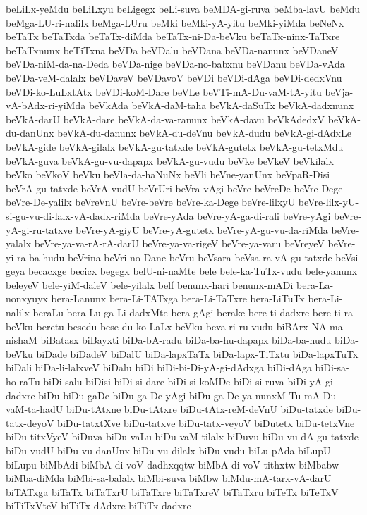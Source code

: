 {beLiLx-yeMdu
beLiLxyu
beLigegx
beLi-suva
beMDA-gi-ruva
beMba-lavU
beMdu
beMga-LU-ri-nalilx
beMga-LUru
beMki
beMki-yA-yitu
beMki-yiMda
beNeNx
beTaTx
beTaTxda
beTaTx-diMda
beTaTx-ni-Da-beVku
beTaTx-ninx-TaTxre
beTaTxnunx
beTiTxna
beVDa
beVDalu
beVDana
beVDa-nanunx
beVDaneV
beVDa-niM-da-na-Deda
beVDa-nige
beVDa-no-babxnu
beVDanu
beVDa-vAda
beVDa-veM-dalalx
beVDaveV
beVDavoV
beVDi
beVDi-dAga
beVDi-dedxVnu
beVDi-ko-LuLxtAtx
beVDi-koM-Dare
beVLe
beVTi-mA-Du-vaM-tA-yitu
beVja-vA-bAdx-ri-yiMda
beVkAda
beVkA-daM-taha
beVkA-daSuTx
beVkA-dadxnunx
beVkA-darU
beVkA-dare
beVkA-da-va-ranunx
beVkA-davu
beVkAdedxV
beVkA-du-danUnx
beVkA-du-danunx
beVkA-du-deVnu
beVkA-dudu
beVkA-gi-dAdxLe
beVkA-gide
beVkA-gilalx
beVkA-gu-tatxde
beVkA-gutetx
beVkA-gu-tetxMdu
beVkA-guva
beVkA-gu-vu-dapapx
beVkA-gu-vudu
beVke
beVkeV
beVkilalx
beVko
beVkoV
beVku
beVla-da-haNuNx
beVli
beVne-yanUnx
beVpaR-Disi
beVrA-gu-tatxde
beVrA-vudU
beVrUri
beVra-vAgi
beVre
beVreDe
beVre-Dege
beVre-De-yalilx
beVreVnU
beVre-beVre
beVre-ka-Dege
beVre-lilxyU
beVre-lilx-yU-si-gu-vu-di-lalx-vA-dadx-riMda
beVre-yAda
beVre-yA-ga-di-rali
beVre-yAgi
beVre-yA-gi-ru-tatxve
beVre-yA-giyU
beVre-yA-gutetx
beVre-yA-gu-vu-da-riMda
beVre-yalalx
beVre-ya-va-rA-rA-darU
beVre-ya-va-rigeV
beVre-ya-varu
beVreyeV
beVre-yi-ra-ba-hudu
beVrina
beVri-no-Dane
beVru
beVsara
beVsa-ra-vA-gu-tatxde
beVsi-geya
becacxge
becicx
begegx
belU-ni-naMte
bele
bele-ka-TuTx-vudu
bele-yanunx
beleyeV
bele-yiM-daleV
bele-yilalx
belf
benunx-hari
benunx-mADi
bera-La-nonxyuyx
bera-Lanunx
bera-Li-TATxga
bera-Li-TaTxre
bera-LiTuTx
bera-Li-nalilx
beraLu
bera-Lu-ga-Li-dadxMte
bera-gAgi
berake
bere-ti-dadxre
bere-ti-ra-beVku
beretu
besedu
bese-du-ko-LaLx-beVku
beva-ri-ru-vudu
biBArx-NA-ma-nishaM
biBatasx
biBayxti
biDa-bA-radu
biDa-ba-hu-dapapx
biDa-ba-hudu
biDa-beVku
biDade
biDadeV
biDalU
biDa-lapxTaTx
biDa-lapx-TiTxtu
biDa-lapxTuTx
biDali
biDa-li-lalxveV
biDalu
biDi
biDi-bi-Di-yA-gi-dAdxga
biDi-dAga
biDi-sa-ho-raTu
biDi-salu
biDisi
biDi-si-dare
biDi-si-koMDe
biDi-si-ruva
biDi-yA-gi-dadxre
biDu
biDu-gaDe
biDu-ga-De-yAgi
biDu-ga-De-ya-nunxM-Tu-mA-Du-vaM-ta-hadU
biDu-tAtxne
biDu-tAtxre
biDu-tAtx-reM-deVnU
biDu-tatxde
biDu-tatx-deyoV
biDu-tatxtXve
biDu-tatxve
biDu-tatx-veyoV
biDutetx
biDu-tetxVne
biDu-titxVyeV
biDuva
biDu-vaLu
biDu-vaM-tilalx
biDuvu
biDu-vu-dA-gu-tatxde
biDu-vudU
biDu-vu-danUnx
biDu-vu-dilalx
biDu-vudu
biLu-pAda
biLupU
biLupu
biMbAdi
biMbA-di-voV-dadhxqqtw
biMbA-di-voV-tithxtw
biMbabw
biMba-diMda
biMbi-sa-balalx
biMbi-suva
biMbw
biMdu-mA-tarx-vA-darU
biTATxga
biTaTx
biTaTxrU
biTaTxre
biTaTxreV
biTaTxru
biTeTx
biTeTxV
biTiTxVteV
biTiTx-dAdxre
biTiTx-dadxre
}
